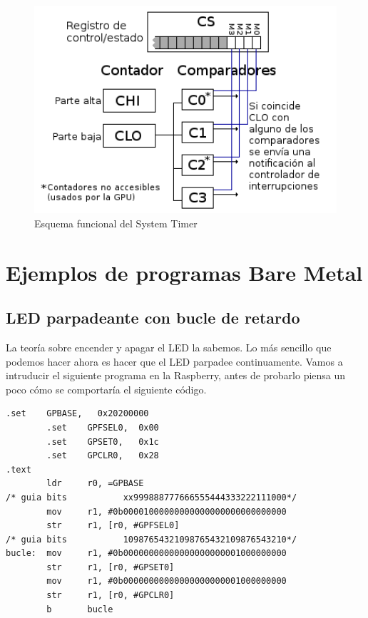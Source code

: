 \begin{figure}[h]
  \centering
    \includegraphics[width=14cm]{graphs/esquematimer.png}
  \caption{Esquema funcional del System Timer}
  \label{fig:esqtim}
\end{figure}


\section{Ejemplos de programas Bare Metal}

\subsection{LED parpadeante con bucle de retardo}

La teoría sobre encender y apagar el LED la sabemos. Lo más sencillo que podemos hacer ahora
es hacer que el LED parpadee continuamente. Vamos a intruducir el siguiente programa en la
Raspberry, antes de probarlo piensa un poco cómo se comportaría el siguiente código.

\begin{lstlisting}[caption={esbn3.s},label={lst:codigoPract4_3}]
        .set    GPBASE,   0x20200000
        .set    GPFSEL0,  0x00
        .set    GPSET0,   0x1c
        .set    GPCLR0,   0x28
.text
        ldr     r0, =GPBASE
/* guia bits           xx999888777666555444333222111000*/
        mov     r1, #0b00001000000000000000000000000000
        str     r1, [r0, #GPFSEL0]
/* guia bits           10987654321098765432109876543210*/
bucle:  mov     r1, #0b00000000000000000000001000000000
        str     r1, [r0, #GPSET0]
        mov     r1, #0b00000000000000000000001000000000
        str     r1, [r0, #GPCLR0]
        b       bucle
\end{lstlisting}

